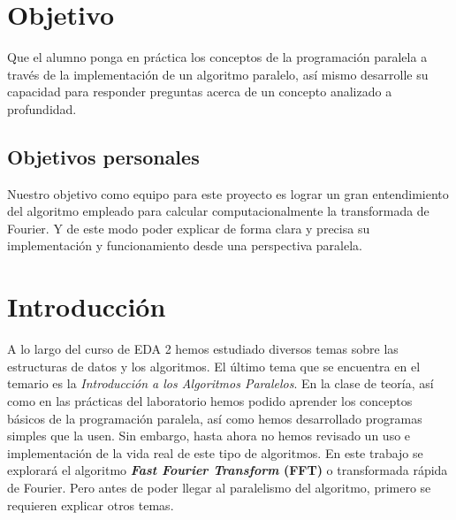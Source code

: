 \documentclass{report}
\begin{document}
\section*{Objetivo}
\noindent
Que el alumno ponga en práctica los conceptos de la programación paralela a través de la implementación de un algoritmo paralelo, así mismo desarrolle su capacidad para responder
preguntas acerca de un concepto analizado a profundidad.
\subsection*{Objetivos personales}
\noindent
Nuestro objetivo como equipo para este proyecto es lograr un gran entendimiento del algoritmo empleado para calcular computacionalmente la transformada de Fourier. Y de este modo poder explicar de forma clara y precisa su implementación y funcionamiento desde una perspectiva paralela.

\section*{Introducción}

\noindent 
A lo largo del curso de EDA 2 hemos estudiado diversos temas sobre las estructuras de datos y los algoritmos. El último tema que se encuentra en el temario es la \textit{Introducción a los Algoritmos Paralelos}. En la clase de teoría, así como en las prácticas del laboratorio hemos podido aprender los conceptos básicos de la programación paralela, así como hemos desarrollado programas simples que la usen. Sin embargo, hasta ahora no hemos revisado un uso e implementación de la vida real de este tipo de algoritmos. En este trabajo se explorará el algoritmo \textbf{\textit{Fast Fourier Transform} (FFT)} o transformada rápida de Fourier. Pero antes de poder llegar al paralelismo del algoritmo, primero se requieren explicar otros temas.\medskip
\end{document}
